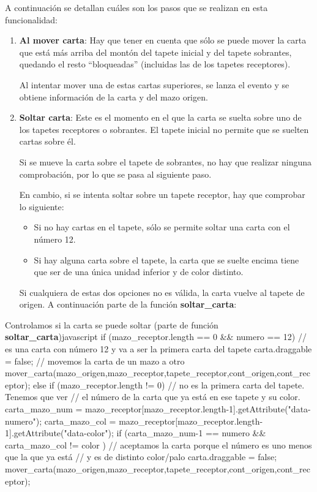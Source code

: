 \documentclass{\ClassPath/viu-tfm-template}
\begin{document}
A continuación se detallan cuáles son los pasos que se realizan en esta funcionalidad:

\vspace{-1em}
\begin{enumerate}
    \item \textbf{Al mover carta}: Hay que tener en cuenta que sólo se puede mover la carta que está más arriba del montón del tapete inicial y del tapete sobrantes, quedando el resto “bloqueadas” (incluidas las de los tapetes receptores).

    Al intentar mover una de estas cartas superiores, se lanza el evento y se obtiene información de la carta y del mazo origen.

    \item \textbf{Soltar carta}: Este es el momento en el que la carta se suelta sobre uno de los tapetes receptores o sobrantes. El tapete inicial no permite que se suelten cartas sobre él.

    Si se mueve la carta sobre el tapete de sobrantes, no hay que realizar ninguna comprobación, por lo que se pasa al siguiente paso.

    En cambio, si se intenta soltar sobre un tapete receptor, hay que comprobar lo siguiente:
        \begin{itemize}
            \item Si no hay cartas en el tapete, sólo se permite soltar una carta con el número 12.
            \item Si hay alguna carta sobre el tapete, la carta que se suelte encima tiene que ser de una única unidad inferior y de color distinto.
        \end{itemize}
    Si cualquiera de estas dos opciones no es válida, la carta vuelve al tapete de origen. A continuación parte de la función \textbf{soltar\_carta}:
\end{enumerate}
\vspace{-0.5em}

\begin{mycode}{Controlamos si la carta se puede soltar (parte de función \textbf{soltar\_carta})}{javascript}{{\footnotesize }}
if (mazo_receptor.length == 0 && numero == 12){
  // es una carta con número 12 y va a ser la primera carta del tapete
  carta.draggable = false;
  // movemos la carta de un mazo a otro
  mover_carta(mazo_origen,mazo_receptor,tapete_receptor,cont_origen,cont_receptor);
} else if (mazo_receptor.length != 0) {
  // no es la primera carta del tapete. Tenemos que ver
  // el número de la carta que ya está en ese tapete y su color.
  carta_mazo_num = mazo_receptor[mazo_receptor.length-1].getAttribute("data-numero");
  carta_mazo_col = mazo_receptor[mazo_receptor.length-1].getAttribute("data-color");
  if (carta_mazo_num-1 == numero && carta_mazo_col != color ) {
    // aceptamos la carta porque el número es uno menos que la que ya está
    // y es de distinto color/palo
    carta.draggable = false;
    mover_carta(mazo_origen,mazo_receptor,tapete_receptor,cont_origen,cont_receptor);
  }
}
\end{mycode}
\end{document}
